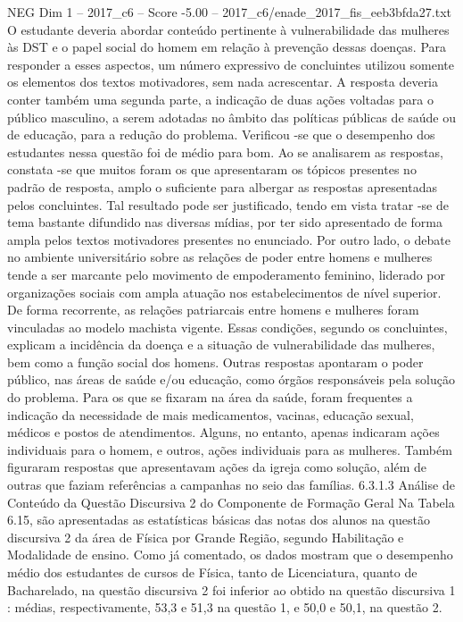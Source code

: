 \begin{textsample}{NEG Dim 1 – 2017\_c6 – Score -5.00 – 2017\_c6/enade\_2017\_fis\_eeb3bfda27.txt}
O estudante deveria abordar conteúdo pertinente à vulnerabilidade das mulheres às DST e o papel social do homem em relação à prevenção dessas doenças.
Para responder a esses aspectos, um número expressivo de concluintes utilizou somente os elementos dos textos motivadores, sem nada acrescentar.
A resposta deveria conter também uma segunda parte, a indicação de duas ações voltadas para o público masculino, a serem adotadas no âmbito das políticas públicas de saúde ou de educação, para a redução do problema.
Verificou -se que o desempenho dos estudantes nessa questão foi de médio para bom.
Ao se analisarem as respostas, constata -se que muitos foram os que apresentaram os tópicos presentes no padrão de resposta, amplo o suficiente para albergar as respostas apresentadas pelos concluintes.
Tal resultado pode ser justificado, tendo em vista tratar -se de tema bastante difundido nas diversas mídias, por ter sido apresentado de forma ampla pelos textos motivadores presentes no enunciado.
Por outro lado, o debate no ambiente universitário sobre as relações de poder entre homens e mulheres tende a ser marcante pelo movimento de empoderamento feminino, liderado por organizações sociais com ampla atuação nos estabelecimentos de nível superior.
De forma recorrente, as relações patriarcais entre homens e mulheres foram vinculadas ao modelo machista vigente.
Essas condições, segundo os concluintes, explicam a incidência da doença e a situação de vulnerabilidade das mulheres, bem como a função social dos homens.
Outras respostas apontaram o poder público, nas áreas de saúde e/ou educação, como órgãos responsáveis pela solução do problema.
Para os que se fixaram na área da saúde, foram frequentes a indicação da necessidade de mais medicamentos, vacinas, educação sexual, médicos e postos de atendimentos.
Alguns, no entanto, apenas indicaram ações individuais para o homem, e outros, ações individuais para as mulheres.
Também figuraram respostas que apresentavam ações da igreja como solução, além de outras que faziam referências a campanhas no seio das famílias. 6.3.1.3 Análise de Conteúdo da Questão Discursiva 2 do Componente de Formação Geral Na Tabela 6.15, são apresentadas as estatísticas básicas das notas dos alunos na questão discursiva 2 da área de Física por Grande Região, segundo Habilitação e Modalidade de ensino.
Como já comentado, os dados mostram que o desempenho médio dos estudantes de cursos de Física, tanto de Licenciatura, quanto de Bacharelado, na questão discursiva 2 foi inferior ao obtido na questão discursiva 1 : médias, respectivamente, 53,3 e 51,3 na questão 1, e 50,0 e 50,1, na questão 2.

\end{textsample}
